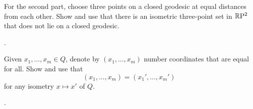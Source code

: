 For the second part, choose three points on a closed geodesic at equal distances from each other.
Show and use that there is an isometric three-point set in $\mathbb{R}\mathrm{P}^2$ that does not lie on a closed geodesic.

 \cite[V \S 2]{busemann-1942}.

Given $x_1,\dots,x_m\in Q$, denote by $(x_1,\dots,x_m)$ number coordinates that are equal for all.
Show and use that 
\[(x_1,\dots,x_m)=(x_1',\dots,x_m')\]
for any isometry $x\mapsto x'$ of $Q$.

 \cite[prop. 6 and 7]{berestovskii-nikonorov}.
